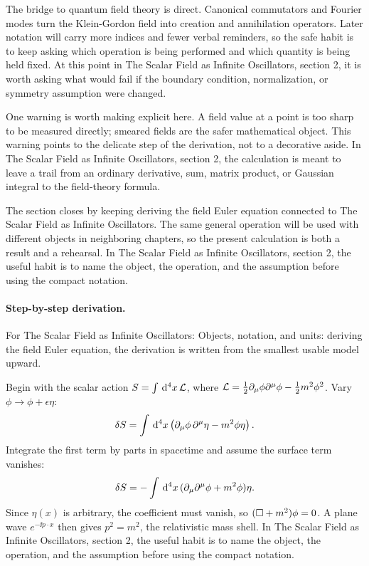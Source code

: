 The bridge to quantum field theory is direct.  Canonical commutators and Fourier modes turn the Klein-Gordon field into creation and annihilation operators.  Later notation will carry more indices and fewer verbal reminders, so the safe habit is to keep asking which operation is being performed and which quantity is being held fixed.  At this point in The Scalar Field as Infinite Oscillators, section 2, it is worth asking what would fail if the boundary condition, normalization, or symmetry assumption were changed.

One warning is worth making explicit here.  A field value at a point is too sharp to be measured directly; smeared fields are the safer mathematical object.  This warning points to the delicate step of the derivation, not to a decorative aside.  In The Scalar Field as Infinite Oscillators, section 2, the calculation is meant to leave a trail from an ordinary derivative, sum, matrix product, or Gaussian integral to the field-theory formula.

The section closes by keeping deriving the field Euler equation connected to The Scalar Field as Infinite Oscillators.  The same general operation will be used with different objects in neighboring chapters, so the present calculation is both a result and a rehearsal.  In The Scalar Field as Infinite Oscillators, section 2, the useful habit is to name the object, the operation, and the assumption before using the compact notation.



\paragraph{Step-by-step derivation.}

For The Scalar Field as Infinite Oscillators: Objects, notation, and units: deriving the field Euler equation, the derivation is written from the smallest usable model upward.

Begin with the scalar action \(S=\int\,\mathrm d^4x\,\mathcal L\), where \(\mathcal L=\frac12\partial_\mu\phi\partial^\mu\phi-\frac12m^2\phi^2\).  Vary \(\phi\to\phi+\epsilon\eta\):
\[
  \delta S=\int\,\mathrm d^4x\left(\partial_\mu\phi\,\partial^\mu\eta-m^2\phi\eta\right).
\]
Integrate the first term by parts in spacetime and assume the surface term vanishes:
\[
  \delta S=-\int\,\mathrm d^4x\,(\partial_\mu\partial^\mu\phi+m^2\phi)\eta.
\]
Since \(\eta(x)\) is arbitrary, the coefficient must vanish, so \((\Box+m^2)\phi=0\).  A plane wave \(e^{-\ii p\cdot x}\) then gives \(p^2=m^2\), the relativistic mass shell.  In The Scalar Field as Infinite Oscillators, section 2, the useful habit is to name the object, the operation, and the assumption before using the compact notation.

